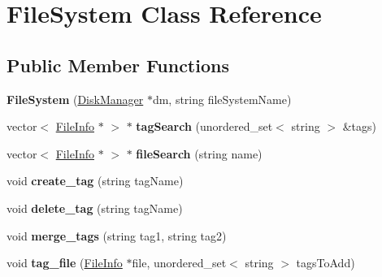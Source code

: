 \hypertarget{classFileSystem}{}\section{File\+System Class Reference}
\label{classFileSystem}
\subsection*{Public Member Functions}
\begin{DoxyCompactItemize}
\item 
\mbox{\label{classFileSystem_a3c9bf0d395385ca84319dcfaf9d005f4}} 
{\bfseries File\+System} (\mbox{\hyperlink{classDiskManager}{Disk\+Manager}} $\ast$dm, string file\+System\+Name)
\item 
\mbox{\label{classFileSystem_afa5afeedec00348c8d1ab922dac9b086}} 
vector$<$ \mbox{\hyperlink{classFileInfo}{File\+Info}} $\ast$ $>$ $\ast$ {\bfseries tag\+Search} (unordered\+\_\+set$<$ string $>$ \&tags)
\item 
\mbox{\label{classFileSystem_aaa02d1a13bb71582a2a4268d32cba5b6}} 
vector$<$ \mbox{\hyperlink{classFileInfo}{File\+Info}} $\ast$ $>$ $\ast$ {\bfseries file\+Search} (string name)
\item 
\mbox{\label{classFileSystem_a678d743f3dc5b86c0b0c568795ec6a29}} 
void {\bfseries create\+\_\+tag} (string tag\+Name)
\item 
\mbox{\label{classFileSystem_a7c1842bbdfc9bb43c848b21886dac602}} 
void {\bfseries delete\+\_\+tag} (string tag\+Name)
\item 
\mbox{\label{classFileSystem_a639cbe0f8e5be5793cc20594c493a2c8}} 
void {\bfseries merge\+\_\+tags} (string tag1, string tag2)
\item 
\mbox{\label{classFileSystem_a33649a9100b30978db80654ece6504f4}} 
void {\bfseries tag\+\_\+file} (\mbox{\hyperlink{classFileInfo}{File\+Info}} $\ast$file, unordered\+\_\+set$<$ string $>$ tags\+To\+Add)
\item 
\mbox{\label{classFileSystem_ac41a4071cfd0f4470f606e24c04740b7}} 

\end{DoxyCompactItemize}

